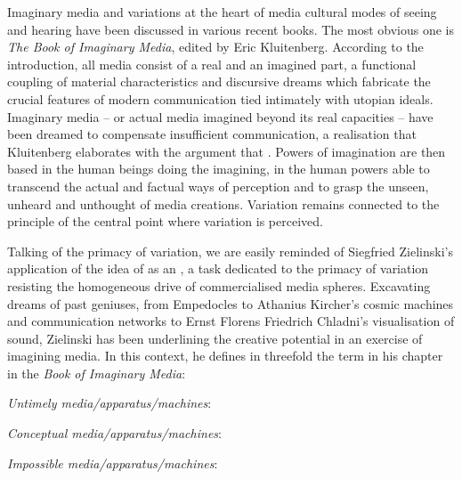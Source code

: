 {Imaginary media and variations at the heart of media cultural modes of
seeing and hearing have been discussed in various recent books. The
most obvious one is {\em The Book of Imaginary Media}, edited by
Eric Kluitenberg. According to the introduction, all media consist of a
real and an imagined part, a functional coupling of material
characteristics and discursive dreams which fabricate the crucial
features of modern communication tied intimately with utopian ideals.
Imaginary media {--} or actual media imagined beyond its real
capacities {--} have been dreamed to compensate insufficient
communication, a realisation that Kluitenberg elaborates with the
argument that . Powers of
imagination are then based in the human beings doing the imagining, in
the human powers able to transcend the actual and factual ways of
perception and to grasp the unseen, unheard and unthought of media
creations. Variation remains connected to the principle of the central
point where variation is perceived.

Talking of the primacy of variation, we are easily reminded of Siegfried
Zielinski's application of the idea of  as an
, a task dedicated to the primacy of variation
resisting the homogeneous drive of commercialised media spheres.
Excavating dreams of past geniuses, from Empedocles to Athanius
Kircher's cosmic machines and communication networks to Ernst Florens
Friedrich Chladni's visualisation of sound, Zielinski has been
underlining the creative potential in an exercise of imagining media.
In this context, he defines in threefold the term  in
his chapter in the {\em Book of Imaginary Media}:

\startitemize
\item {\em Untimely media/apparatus/machines}: 
\item {\em Conceptual media/apparatus/machines}: 
\item {\em Impossible media/apparatus/machines}: 
\stopitemize

}
